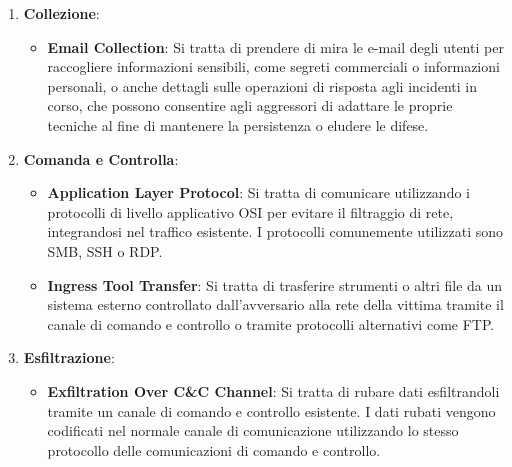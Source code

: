 \documentclass{article}
\begin{document}
\begin{enumerate}
\begin{itemize}
            \item \textbf{Internal Spearphishing}: Si tratta di utilizzare lo spearphishing interno per ottenere l'accesso a informazioni aggiuntive o compromettere altri utenti all'interno della stessa organizzazione. Spesso tramite \textbf{impersonificazione} gli attaccanti, possono quindi tentare di sfruttare l'account interno attendibile per aumentare la probabilità di ingannare più vittime inducendole a cadere in tentativi di phishing.
            
        \end{itemize}

    \item \textbf{Collezione}:
        \begin{itemize}
            \item \textbf{Email Collection}: Si tratta di prendere di mira le e-mail degli utenti per raccogliere informazioni sensibili, come segreti commerciali o informazioni personali, o anche dettagli sulle operazioni di risposta agli incidenti in corso, che possono consentire agli aggressori di adattare le proprie tecniche al fine di mantenere la persistenza o eludere le difese.
        \end{itemize}

    \item \textbf{Comanda e Controlla}:
        \begin{itemize}
            \item \textbf{Application Layer Protocol}: Si tratta di comunicare utilizzando i protocolli di livello applicativo OSI per evitare il filtraggio di rete, integrandosi nel traffico esistente. I protocolli comunemente utilizzati sono SMB, SSH o RDP.

            \item \textbf{Ingress Tool Transfer}: Si tratta di trasferire strumenti o altri file da un sistema esterno controllato dall'avversario alla rete della vittima tramite il canale di comando e controllo o tramite protocolli alternativi come FTP.
        \end{itemize}

    \item \textbf{Esfiltrazione}:
        \begin{itemize}
            \item \textbf{Exfiltration Over C\&C Channel}: Si tratta di rubare dati esfiltrandoli tramite un canale di comando e controllo esistente. I dati rubati vengono codificati nel normale canale di comunicazione utilizzando lo stesso protocollo delle comunicazioni di comando e controllo.


\end{itemize}
\end{enumerate}
\end{document}
